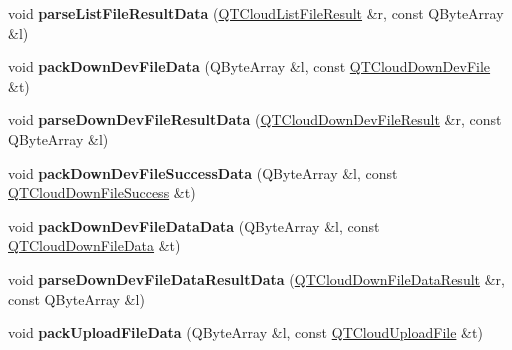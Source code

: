 \begin{DoxyCompactItemize}
\item 
\mbox{\label{class_q_q_t_cloud_protocol_abada8cb77bfcdbca24ab89c6a51b0521}} 
void {\bfseries parse\+List\+File\+Result\+Data} (\mbox{\hyperlink{structtag_q_t_cloud_list_file_result}{Q\+T\+Cloud\+List\+File\+Result}} \&r, const Q\+Byte\+Array \&l)
\item 
\mbox{\label{class_q_q_t_cloud_protocol_a1f993da5f82fa81e0febb263fd4423b3}} 
void {\bfseries pack\+Down\+Dev\+File\+Data} (Q\+Byte\+Array \&l, const \mbox{\hyperlink{structtag_tank_down_dev_file}{Q\+T\+Cloud\+Down\+Dev\+File}} \&t)
\item 
\mbox{\label{class_q_q_t_cloud_protocol_a079e23cfb7fedc03e51221c19be634ad}} 
void {\bfseries parse\+Down\+Dev\+File\+Result\+Data} (\mbox{\hyperlink{structtag_q_t_cloud_down_file_result}{Q\+T\+Cloud\+Down\+Dev\+File\+Result}} \&r, const Q\+Byte\+Array \&l)
\item 
\mbox{\label{class_q_q_t_cloud_protocol_a74a817ce41be302302ddd931a16404dc}} 
void {\bfseries pack\+Down\+Dev\+File\+Success\+Data} (Q\+Byte\+Array \&l, const \mbox{\hyperlink{structtag_q_t_cloud_cancel_down_file}{Q\+T\+Cloud\+Down\+File\+Success}} \&t)
\item 
\mbox{\label{class_q_q_t_cloud_protocol_a56c048f1742bc2d29ca3e96ba02d1b61}} 
void {\bfseries pack\+Down\+Dev\+File\+Data\+Data} (Q\+Byte\+Array \&l, const \mbox{\hyperlink{structtag_q_t_cloud_down_file_data}{Q\+T\+Cloud\+Down\+File\+Data}} \&t)
\item 
\mbox{\label{class_q_q_t_cloud_protocol_a83e9811d73019d3919190b2f07d25fba}} 
void {\bfseries parse\+Down\+Dev\+File\+Data\+Result\+Data} (\mbox{\hyperlink{structtag_q_t_cloud_down_file_data_result}{Q\+T\+Cloud\+Down\+File\+Data\+Result}} \&r, const Q\+Byte\+Array \&l)
\item 
\mbox{\label{class_q_q_t_cloud_protocol_a690fcfd1061f58f0d207f0111ee87e1c}} 
void {\bfseries pack\+Upload\+File\+Data} (Q\+Byte\+Array \&l, const \mbox{\hyperlink{structtag_tank_upload_file}{Q\+T\+Cloud\+Upload\+File}} \&t)
\item 

\end{DoxyCompactItemize}
